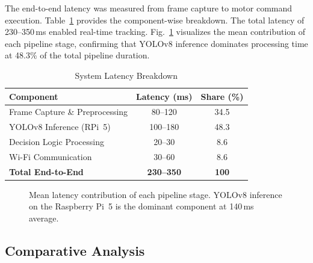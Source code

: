 \documentclass[conference]{IEEEtran}
\begin{document}
The end-to-end latency was measured from frame capture to motor command execution. Table~\ref{tab:latency} provides the component-wise breakdown. The total latency of 230--350\,ms enabled real-time tracking. Fig.~\ref{fig:latency_bar} visualizes the mean contribution of each pipeline stage, confirming that YOLOv8 inference dominates processing time at 48.3\% of the total pipeline duration.

\begin{table}[!t]
\centering
\caption{System Latency Breakdown}
\label{tab:latency}
\begin{tabular}{lcc}
\toprule
\textbf{Component} & \textbf{Latency (ms)} & \textbf{Share (\%)}\\
\midrule
Frame Capture \& Preprocessing  & 80--120  & 34.5\\
YOLOv8 Inference (RPi~5)       & 100--180 & 48.3\\
Decision Logic Processing       & 20--30   & 8.6\\
Wi-Fi Communication              & 30--60   & 8.6\\
\midrule
\textbf{Total End-to-End}        & \textbf{230--350} & \textbf{100}\\
\bottomrule
\end{tabular}
\end{table}

\begin{figure}[!t]
\centering
{}
\caption{Mean latency contribution of each pipeline stage. YOLOv8 inference on the Raspberry Pi~5 is the dominant component at 140\,ms average.}
\label{fig:latency_bar}
\end{figure}

\subsection{Comparative Analysis}
\end{document}
